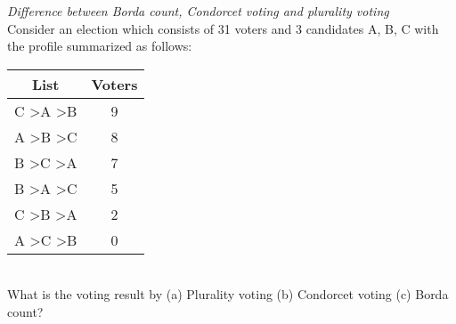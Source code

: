 \documentclass[12pt]{article}
\newenvironment{problem}[2][Problem]{\begin{trivlist}
\item[\hskip \labelsep {\bfseries #1}\hskip \labelsep {\bfseries #2.}]}{\end{trivlist}}
\begin{document}
\begin{problem}{1}
	\textit{Difference between Borda count, Condorcet voting and plurality voting}\\
	Consider an election which consists of 31 voters and 3 candidates A, B, C with the profile summarized as follows:
	\begin{table}[h!]
		\centering
		\begin{tabular}{|c|c|}
			\hline
			List                            & Voters \\ \hline
			C \textgreater A \textgreater B & 9      \\ \hline
			A \textgreater B \textgreater C & 8      \\ \hline
			B \textgreater C \textgreater A & 7      \\ \hline
			B \textgreater A \textgreater C & 5      \\ \hline
			C \textgreater B \textgreater A & 2      \\ \hline
			A \textgreater C \textgreater B & 0      \\ \hline
		\end{tabular}
	\end{table}\\
	What is the voting result by (a) Plurality voting (b) Condorcet voting (c) Borda count?
\end{problem}
\end{document}
